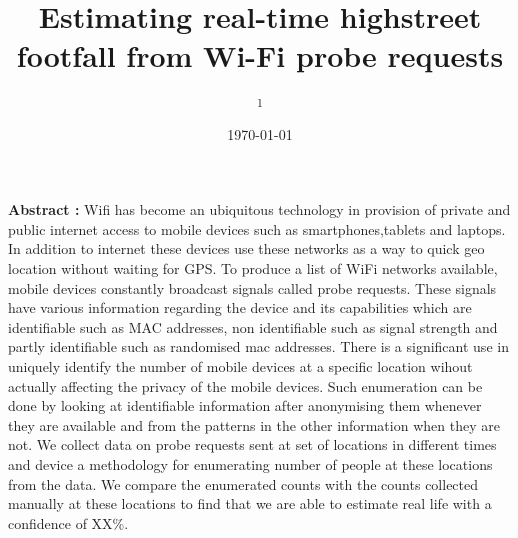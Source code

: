 \documentclass[11t, a4paper, twocolumn]{article}
\title{Estimating real-time highstreet  footfall from Wi-Fi probe requests}
\author{
	\authorstyle{
		Balamurugan Soundararaj\textsuperscript{1}, 
		James Cheshire\textsuperscript{1} and 
		Paul Longley\textsuperscript{1}}
	\newline\newline
	\textsuperscript{1}\institution{
		Department of Geography, 
		University College London, 
		United Kingdom}
}
\date{\today}
\begin{document}

	\maketitle
	\thispagestyle{firstpage}

	\textbf{Abstract : }
	Wifi has become an ubiquitous technology in provision of private and public 
	internet access to mobile devices such as smartphones,tablets and laptops.
	In addition to internet these devices use these networks as a way to quick 
	geo location without waiting for GPS.
	To produce a list of WiFi networks available, mobile devices constantly 
	broadcast signals called probe requests.
	These signals have various information regarding the device and its 
	capabilities which are identifiable such as MAC addresses, non identifiable 
	such as signal strength and partly identifiable such as randomised mac 
	addresses.
	There is a significant use in uniquely identify the number of mobile devices
	at a specific location wihout actually affecting the privacy of the mobile
	devices.
	Such enumeration can be done by looking at identifiable information after 
	anonymising them whenever they are available and from the patterns in the 
	other information when they are not.
	We collect data on probe requests sent at set of locations in 
	different times and device a methodology for enumerating number of people
	at these locations from the data.
	We compare the enumerated counts with the counts collected manually at
	these locations to find that we are able to estimate real life with a 
	confidence of XX\%.
	
\end{document}
